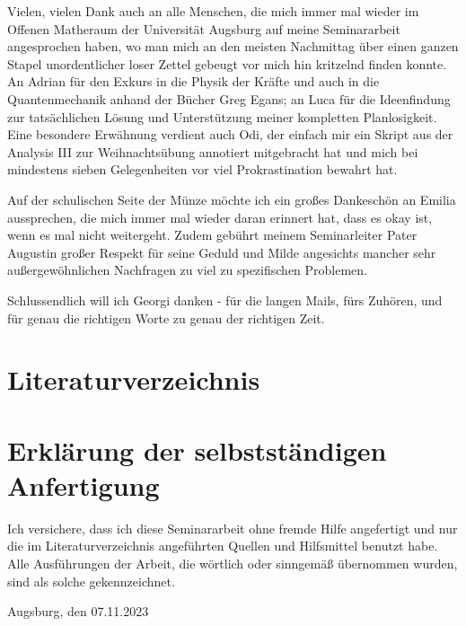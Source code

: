 Vielen, vielen Dank auch an alle Menschen, die mich immer mal wieder im Offenen Matheraum der Universität Augsburg auf meine Seminararbeit angesprochen haben, wo man mich an den meisten Nachmittag über einen ganzen Stapel unordentlicher loser Zettel gebeugt vor mich hin kritzelnd finden konnte. 
An Adrian für den Exkurs in die Physik der Kräfte
und auch in die Quantenmechanik anhand der Bücher Greg Egans; 
an Luca für die Ideenfindung zur tatsächlichen Lösung
und Unterstützung meiner kompletten Planlosigkeit. 
Eine besondere Erwähnung verdient auch Odi,
der einfach mir ein Skript aus der Analysis III
zur Weihnachtsübung annotiert mitgebracht hat und
mich bei mindestens sieben Gelegenheiten vor viel Prokrastination bewahrt hat.

Auf der schulischen Seite der Münze möchte ich ein großes Dankeschön an Emilia aussprechen,
die mich immer mal wieder daran erinnert hat,
dass es okay ist, wenn es mal nicht weitergeht. 
Zudem gebührt meinem Seminarleiter Pater Augustin
großer Respekt für seine Geduld und Milde angesichts mancher
sehr außergewöhnlichen Nachfragen zu viel zu spezifischen Problemen. 

Schlussendlich will ich Georgi danken - für die langen Mails, fürs Zuhören, und für genau die richtigen Worte zu genau der richtigen Zeit.


\medskip

\chapter*{Literaturverzeichnis}
\printbibliography[title={Monographien},type=book,sorting=nyt,heading=subbibliography]
\printbibliography[title=
{Internetquellen},type=online,sorting=nyt,heading=subbibliography]
\thispagestyle{empty}

\listoffigures
\thispagestyle{empty}
\newpage
\chapter*{Erklärung der selbstständigen Anfertigung}

Ich versichere, dass ich diese Seminararbeit ohne fremde Hilfe angefertigt und nur die im Literaturverzeichnis angeführten Quellen und Hilfsmittel benutzt habe.
Alle Ausführungen der Arbeit, die wörtlich oder sinngemäß übernommen wurden, sind als solche gekennzeichnet.


\vspace{32pt}


Augsburg, den 07.11.2023

